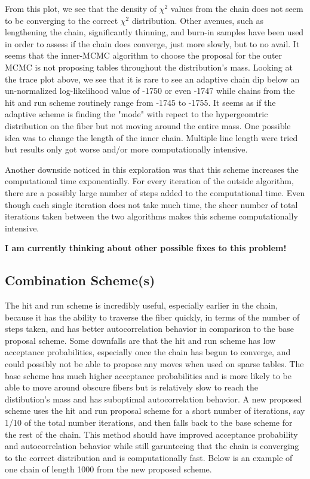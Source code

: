 \documentclass{phd}\usepackage[]{graphicx}\usepackage[]{color}
\begin{document}
From this plot, we see that the density of $\chi^2$ values from the chain does not seem to be converging to the correct $\chi^2$ distribution. Other avenues, such as lengthening the chain, significantly thinning, and burn-in samples have been used in order to assess if the chain does converge, just more slowly, but to no avail. It seems that the inner-MCMC algorithm to choose the proposal for the outer MCMC is not proposing tables throughout the distribution's mass. Looking at the trace plot above, we see that it is rare to see an adaptive chain dip below an un-normalized log-likelihood value of -1750 or even -1747 while chains from the hit and run scheme routinely range from -1745 to -1755. It seems as if the adaptive scheme is finding the "mode" with repect to the hypergeomtric distribution on the fiber but not moving around the entire mass. One possible idea was to change the length of the inner chain. Multiple line length were tried but results only got worse and/or more computationally intensive. 

Another downside noticed in this exploration was that this scheme increases the computational time exponentially. For every iteration of the outside algorithm, there are a possibly large number of steps added to the computational time. Even though each single iteration does not take much time, the sheer number of total iterations taken between the two algorithms makes this scheme computationally intensive. 

\textbf{I am currently thinking about other possible fixes to this problem!}


\subsection{Combination Scheme(s)}

The hit and run scheme is incredibly useful, especially earlier in the chain, because it has the ability to traverse the fiber quickly, in terms of the number of steps taken, and has better autocorrelation behavior in comparison to the base proposal scheme. Some downfalls are that the hit and run scheme has low acceptance probabilities, especially once the chain has begun to converge, and could possibly not be able to propose any moves when used on sparse tables. The base scheme has much higher acceptance probabilities and is more likely to be able to move around obscure fibers but is relatively slow to reach the distibution's mass and has suboptimal autocorrelation behavior. A new proposed scheme uses the hit and run proposal scheme for a short number of iterations, say 1/10 of the total number iterations, and then falls back to the base scheme for the rest of the chain. This method should have improved acceptance probability and autocorrelation behavior while still garunteeing that the chain is converging to the correct distribution and is computationally fast. Below is an example of one chain of length 1000 from the new proposed scheme.
\end{document}
